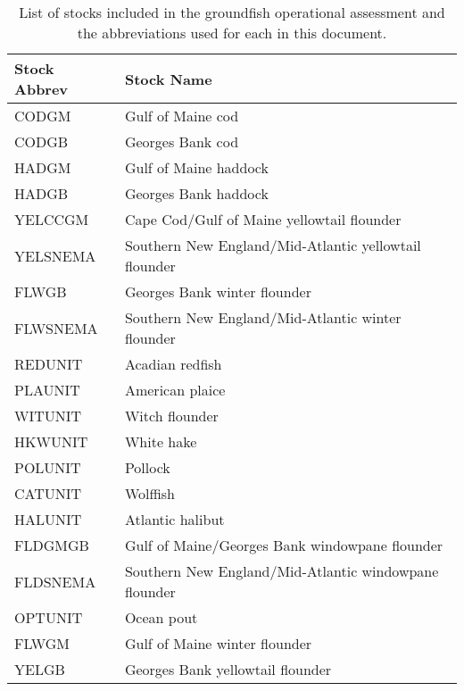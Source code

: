 \begin{table}
	\centering
	
	\caption{ List of stocks included in the groundfish operational assessment and the abbreviations used for each in this document.}
	\label{stock_abbrv_tab}
	\begin{tabular}{ll}
\hline
Stock Abbrev & Stock Name \\
\hline 
CODGM & Gulf of Maine cod \\
CODGB & Georges Bank cod \\
HADGM & Gulf of Maine haddock \\
HADGB & Georges Bank haddock \\
YELCCGM & Cape Cod/Gulf of Maine yellowtail flounder \\
YELSNEMA & Southern New England/Mid-Atlantic yellowtail flounder \\
FLWGB & Georges Bank winter flounder \\
FLWSNEMA & Southern New England/Mid-Atlantic winter flounder \\
REDUNIT & Acadian redfish \\
PLAUNIT & American plaice \\
WITUNIT & Witch flounder \\
HKWUNIT & White hake \\
POLUNIT & Pollock \\
CATUNIT & Wolffish \\
HALUNIT & Atlantic halibut \\
FLDGMGB & Gulf of Maine/Georges Bank windowpane flounder \\
FLDSNEMA & Southern New England/Mid-Atlantic windowpane flounder \\
OPTUNIT & Ocean pout \\
FLWGM & Gulf of Maine winter flounder \\
YELGB & Georges Bank yellowtail flounder \\
\hline
	\end{tabular}
\end{table}